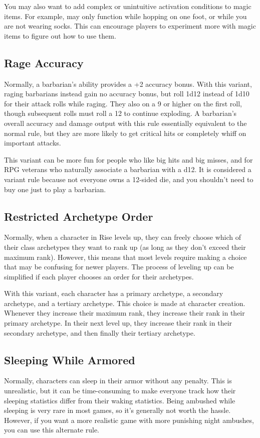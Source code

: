     You may also want to add complex or unintuitive activation conditions to magic items.
    For example,  may only function while hopping on one foot, or while you are not wearing socks.
    This can encourage players to experiment more with magic items to figure out how to use them.

  \subsection{Rage Accuracy}
    Normally, a barbarian's  ability provides a +2 accuracy bonus.
    With this variant, raging barbarians instead gain no accuracy bonus, but roll 1d12 instead of 1d10 for their attack rolls while raging.
    They also  on a 9 or higher on the first roll, though subsequent rolls must roll a 12 to continue exploding.
    A barbarian's overall accuracy and damage output with this rule essentially equivalent to the normal rule, but they are more likely to get critical hits or completely whiff on important attacks.

    This variant can be more fun for people who like big hits and big misses, and for RPG veterans who naturally associate a barbarian with a d12.
    It is considered a variant rule because not everyone owns a 12-sided die, and you shouldn't need to buy one just to play a barbarian.

  \subsection{Restricted Archetype Order}
    Normally, when a character in Rise levels up, they can freely choose which of their class archetypes they want to rank up (as long as they don't exceed their maximum rank).
    However, this means that most levels require making a choice that may be confusing for newer players.
    The process of leveling up can be simplified if each player chooses an order for their archetypes.

    With this variant, each character has a primary archetype, a secondary archetype, and a tertiary archetype.
    This choice is made at character creation.
    Whenever they increase their maximum rank, they increase their rank in their primary archetype.
    In their next level up, they increase their rank in their secondary archetype, and then finally their tertiary archetype.

  \subsection{Sleeping While Armored}
    Normally, characters can sleep in their armor without any penalty.
    This is unrealistic, but it can be time-consuming to make everyone track how their sleeping statistics differ from their waking statistics.
    Being ambushed while sleeping is very rare in most games, so it's generally not worth the hassle.
    However, if you want a more realistic game with more punishing night ambushes, you can use this alternate rule.

